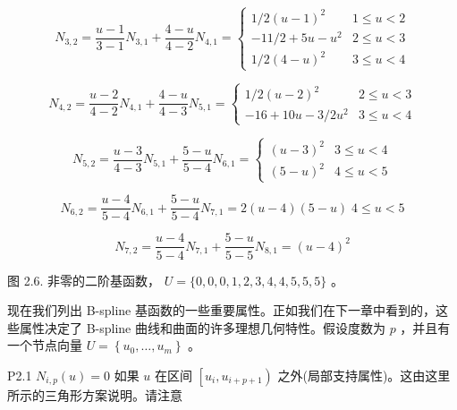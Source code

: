 \documentclass[../main.tex]{subfiles}
\begin{document}
\[
{N}_{3,2} = \frac{u - 1}{3 - 1}{N}_{3,1} + \frac{4 - u}{4 - 2}{N}_{4,1} = \left\{  \begin{matrix} 1/2{\left( u - 1\right) }^{2} & 1 \leq  u < 2 \\   - {11}/2 + {5u} - {u}^{2} & 2 \leq  u < 3 \\  1/2{\left( 4 - u\right) }^{2} & 3 \leq  u < 4 \end{matrix}\right.
\]

\[
{N}_{4,2} = \frac{u - 2}{4 - 2}{N}_{4,1} + \frac{4 - u}{4 - 3}{N}_{5,1} = \left\{  \begin{matrix} 1/2{\left( u - 2\right) }^{2} & 2 \leq  u < 3 \\   - {16} + {10u} - 3/2{u}^{2} & 3 \leq  u < 4 \end{matrix}\right.
\]

\[
{N}_{5,2} = \frac{u - 3}{4 - 3}{N}_{5,1} + \frac{5 - u}{5 - 4}{N}_{6,1} = \left\{  \begin{array}{ll} {\left( u - 3\right) }^{2} & 3 \leq  u < 4 \\  {\left( 5 - u\right) }^{2} & 4 \leq  u < 5 \end{array}\right.
\]

\[
{N}_{6,2} = \frac{u - 4}{5 - 4}{N}_{6,1} + \frac{5 - u}{5 - 4}{N}_{7,1} = 2\left( {u - 4}\right) \left( {5 - u}\right) \;4 \leq  u < 5
\]

\[
{N}_{7,2} = \frac{u - 4}{5 - 4}{N}_{7,1} + \frac{5 - u}{5 - 5}{N}_{8,1} = {\left( u - 4\right) }^{2}
\]



\begin{center}
\begin{minipage}{18cm}
\vspace*{.6\baselineskip}
\centering
{}
\par\smallskip
图 2.6. 非零的二阶基函数， \(U = \{ 0,0,0,1,2,3,4,4,5,5,5\}\) 。
\end{minipage}
\end{center}

现在我们列出 B-spline 基函数的一些重要属性。正如我们在下一章中看到的，这些属性决定了 B-spline 曲线和曲面的许多理想几何特性。假设度数为 \(p\) ，并且有一个节点向量 \(U = \left\{  {{u}_{0},\ldots ,{u}_{m}}\right\}\) 。

P2.1 \({N}_{i,p}\left( u\right)  = 0\) 如果 \(u\) 在区间 \(\left\lbrack  {{u}_{i},{u}_{i + p + 1}}\right)\) 之外(局部支持属性)。这由这里所示的三角形方案说明。请注意
\end{document}
